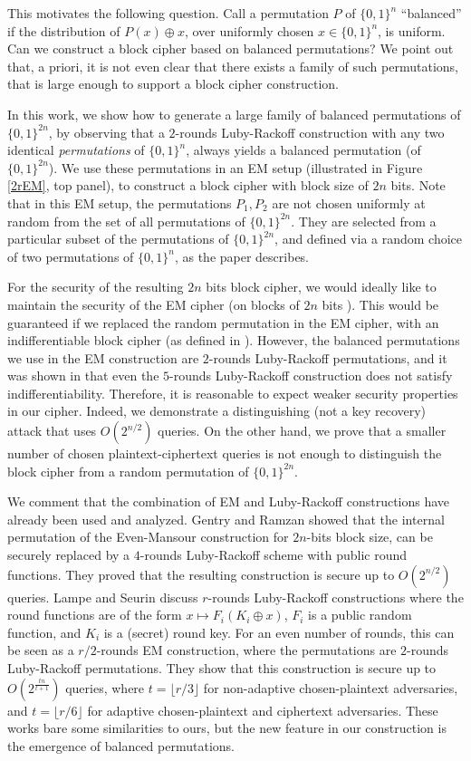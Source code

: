 \documentclass{llncs}
\newcommand{\s}{\{0,1\}}
\begin{document}
This motivates the following question. 
Call a permutation $P$ of $\s^n$ ``balanced'' if the distribution of $P(x)\oplus x$, 
over uniformly chosen $x\in\s^n$, is uniform. Can we construct a block cipher based on balanced permutations?
We point out that, a priori, it is not even clear that there exists a family of such permutations, that is large enough to support a block cipher construction. 

In this work, we show how to generate a large family of balanced permutations of $\{0, 1 \}^{2n}$, by observing that a $2$-rounds Luby-Rackoff construction with any two identical \emph{permutations} of $\s^{n}$, always yields a balanced permutation (of $\s^{2n}$). We use these permutations in an EM setup 
(illustrated in Figure \ref{2rEM}, top panel), to construct a block cipher with block size of $2n$ bits. 
Note that in this EM setup, the permutations $P_1,P_2$ are not 
chosen uniformly at random from the set of all permutations of $\{0, 1 \}^{2n}$. They are selected from a particular subset of the permutations of $\{0, 1 \}^{2n}$, and defined via a random choice of two 
permutations of $\{0, 1 \}^{n}$, as the paper describes. 

For the security of the resulting $2n$ bits block cipher, we would ideally
like to maintain the security of the EM cipher (on blocks of $2n$ bits ). This would be guaranteed if we replaced the random permutation in the EM cipher, with an indifferentiable block cipher (as defined in \cite{MRH}). However, the balanced permutations we use in the EM construction are $2$-rounds Luby-Rackoff permutations, and it was shown in \cite{CPS} that even the $5$-rounds Luby-Rackoff construction does not satisfy indifferentiability. Therefore, it is reasonable to expect weaker security properties in our cipher. 
Indeed, we demonstrate a distinguishing  (not a key recovery) 
attack that uses $O (2^{n/2})$ queries. On the other hand, we prove that a smaller number of chosen plaintext-ciphertext queries is not enough to distinguish the block cipher from a random permutation of $\{0, 1\}^{2n}$. 

We comment that the combination of EM and Luby-Rackoff constructions have already been used and analyzed. 
Gentry and Ramzan \cite{GR} showed that the internal permutation of the Even-Mansour construction for $2n$-bits block size, can be securely replaced by a $4$-rounds Luby-Rackoff scheme with public round functions. They proved that the resulting construction is secure up to $O(2^{n/2})$ queries. 
Lampe and Seurin \cite{LS} discuss $r$-rounds Luby-Rackoff 
constructions where the round functions are of the form $x \mapsto F_i 
(K_i \oplus x)$, $F_i$ is a public random function, and $K_i$ is a (secret) round key. For an even number of rounds, this can be seen as a 
$r/2$-rounds EM construction, where the permutations are $2$-rounds 
Luby-Rackoff permutations. 
They show that this construction is secure up to $O(2^{\frac{tn}{t+1}})$ queries, where $t=\lfloor r/3\rfloor$ for non-adaptive chosen-plaintext adversaries, and $t=\lfloor r/6\rfloor$ for adaptive chosen-plaintext and ciphertext adversaries.
These works bare some similarities to ours, but the new feature in our construction is the emergence of balanced permutations. 
\end{document}
